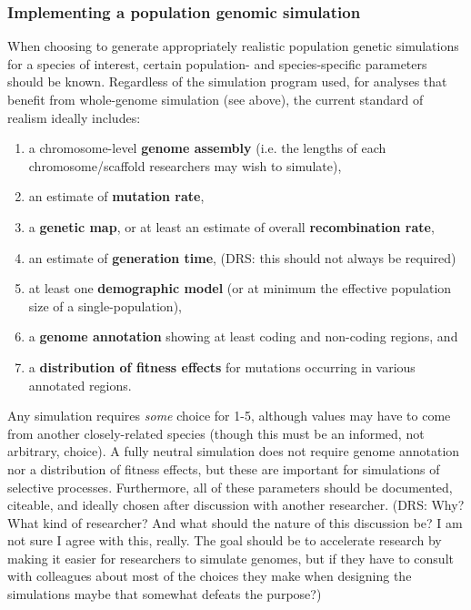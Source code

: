 \documentclass[hidelinks]{article}
\providecommand{\tightlist}{%
\setlength{\itemsep}{0pt}\setlength{\parskip}{0pt}}
\begin{document}
\hypertarget{implementing-a-population-genomic-simulation}{%
\subsubsection*{Implementing a population genomic
simulation}\label{implementing-a-population-genomic-simulation}}

When choosing to generate appropriately realistic population genetic
simulations for a species of interest, certain population- and species-specific
parameters should be known. Regardless of the simulation program used,
for analyses that benefit from whole-genome simulation (see above), 
the current standard of realism ideally includes:

\begin{enumerate}
\def\labelenumi{\arabic{enumi}.}
\tightlist
\item
  a chromosome-level \textbf{genome assembly} (i.e. the lengths of each
  chromosome/scaffold researchers may wish to simulate),
\item
  an estimate of \textbf{mutation rate},
\item
  a \textbf{genetic map}, or at least an estimate of overall \textbf{recombination rate},
\item
  an estimate of \textbf{generation time}, (DRS: this should not always be required)
\item
  at least one \textbf{demographic model} (or at minimum the effective
  population size of a single-population),
\item
  a \textbf{genome annotation} showing at least coding and non-coding
  regions, and
\item
  a \textbf{distribution of fitness effects} for mutations occurring in
  various annotated regions.
\end{enumerate}

Any simulation requires \emph{some} choice for 1-5, although values may
have to come from another closely-related species (though this must be
an informed, not arbitrary, choice). A fully neutral simulation does not
require genome annotation nor a distribution of fitness effects, but
these are important for simulations of selective processes. Furthermore,
all of these parameters should be documented, citeable, and
ideally chosen after discussion with another researcher. (DRS: Why? 
What kind of researcher? And what should the nature of this discussion be? 
I am not sure I agree with this, really. The goal should be to accelerate
research by making it easier for researchers to simulate genomes, but if
they have to consult with colleagues about most of the choices they make
when designing the simulations maybe that somewhat defeats the purpose?)
\end{document}
